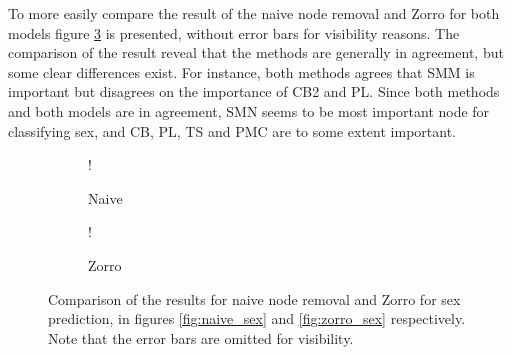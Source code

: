 To more easily compare the result of the naive node removal and Zorro for both models figure \ref{fig:comparison_sex} is presented, without error bars for visibility reasons. The comparison of the result reveal that the methods are generally in agreement, but some clear differences exist. For instance, both methods agrees that SMM is important but disagrees on the importance of CB2 and PL. Since both methods and both models are in agreement, SMN seems to be most important node for classifying sex, and CB, PL, TS and PMC are to some extent important.

\begin{figure}[H]
    \centering
        \begin{subfigure}{.5\textwidth}
            \centering
            \begin{center}
                \resizebox {1.0\linewidth} {!} {
                    
                }
            \end{center}
            \caption{Naive}
            \label{fig:comparison_sex_naive}
        \end{subfigure}%
        \begin{subfigure}{.5\textwidth}
            \centering
            \begin{center}
                \resizebox {1.0\linewidth} {!} {
                    
                }
            \end{center}
            \caption{Zorro}
            \label{fig:comparison_sex_zorro}
        \end{subfigure}
    \caption{Comparison of the results for naive node removal and Zorro for sex prediction, in figures \ref{fig:naive_sex} and \ref{fig:zorro_sex} respectively. Note that the error bars are omitted for visibility.}
    \label{fig:comparison_sex}
\end{figure}




